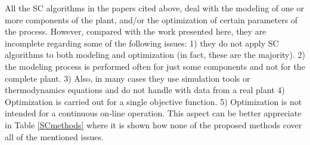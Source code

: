 \bigskip
\par
All the SC algorithms in the papers cited above, deal with the modeling of one or more components of the plant, and/or the optimization of certain parameters of the process. However, compared with the work presented here, they are incomplete regarding some of the following issues: 1) they do not apply SC algorithms to both modeling and optimization (in fact, these are the majority). 2) the modeling process is performed often for just some components and not for the complete plant. 3) Also, in many cases they use simulation tools or thermodynamics equations and do not handle with data from a real plant 4) Optimization is carried out for a single objective function. 5) Optimization is not intended for a continuous on-line operation. This aspect can be better appreciate in Table \ref{SCmethods} where it is shown how none of the proposed methods cover all of the mentioned issues.


